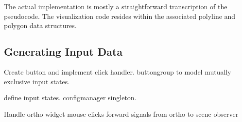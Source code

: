 The actual implementation is mostly a straightforward transcription of the
pseudocode. The visualization code resides within the associated polyline and
polygon data structures.



\subsection{Generating Input Data}

Create button and implement click handler. buttongroup to model mutually
exclusive input states.

define input states. configmanager singleton. 


Handle ortho widget mouse clicks
forward signals from ortho to scene observer




% 
% 
% 
% 
% 
